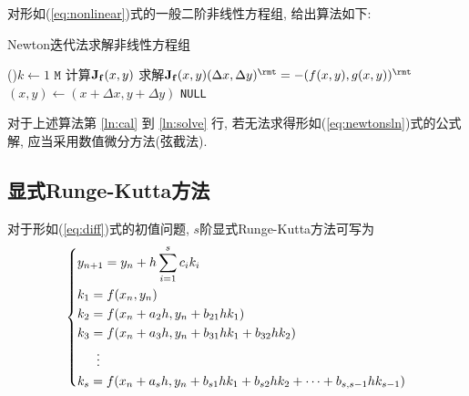 \documentclass{nedsart}
\begin{document}
对形如(\ref{eq:nonlinear})式的一般二阶非线性方程组, 给出算法如下:\par
\begin{algorithm}[H]
    \caption{Newton迭代法求解非线性方程组}
    
    \For(){$k \leftarrow 1$ \KwTo $\mathtt{M}$}{
        计算$\mathbf{J}_{\mathbf{f}} (x, y)$\;\label{ln:cal}
        求解$\jacobi (x, y)(\Delta x, \Delta y)^\rmt = -(f(x, y), g(x, y))^\rmt$\;\label{ln:solve}
        $(x, y) \leftarrow (x + \Delta x, y + \Delta y)$
    }
    \KwRet \texttt{NULL}
\end{algorithm}

对于上述算法第 \ref{ln:cal} 到 \ref{ln:solve} 行, 若无法求得形如(\ref{eq:newtonsln})式的公式解, 应当采用数值微分方法(弦截法).

\subsection{显式Runge-Kutta方法}

对于形如(\ref{eq:diff})式的初值问题, $s$阶显式Runge-Kutta方法可写为
\begin{equation}\label{eq:runge}
    \begin{dcases}
        y_{n+1} = y_n + h \sum_{i=1}^s c_i k_i \\
        k_1 = f(x_n, y_n) \\
        k_2 = f(x_n + a_2 h, y_n + b_{21} h k_1) \\
        k_3 = f(x_n + a_3 h, y_n + b_{31} h k_1 + b_{32} h k_2) \\
        \hspace{1.5em}\vdots \\
        k_s = f(x_n + a_s h, y_n + b_{s1} h k_1 + b_{s2} h k_2 + \cdots + b_{s,s-1} h k_{s-1}) \\
    \end{dcases}
\end{equation}
\end{document}
